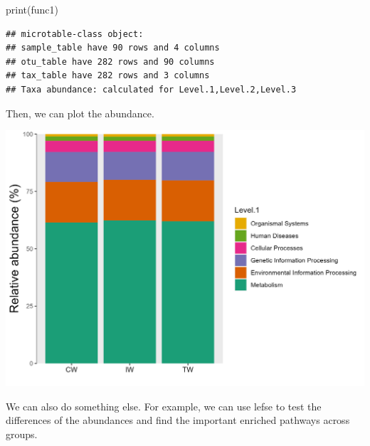 \documentclass[
]{book}
\newenvironment{Shaded}{\begin{snugshade}}{\end{snugshade}}
\newcommand{\AttributeTok}[1]{\textcolor[rgb]{0.77,0.63,0.00}{#1}}
\newcommand{\CommentTok}[1]{\textcolor[rgb]{0.56,0.35,0.01}{\textit{#1}}}
\newcommand{\ConstantTok}[1]{\textcolor[rgb]{0.00,0.00,0.00}{#1}}
\newcommand{\FunctionTok}[1]{\textcolor[rgb]{0.00,0.00,0.00}{#1}}
\newcommand{\NormalTok}[1]{#1}
\newcommand{\OtherTok}[1]{\textcolor[rgb]{0.56,0.35,0.01}{#1}}
\newcommand{\SpecialCharTok}[1]{\textcolor[rgb]{0.00,0.00,0.00}{#1}}
\newcommand{\StringTok}[1]{\textcolor[rgb]{0.31,0.60,0.02}{#1}}
\begin{document}
\begin{Shaded}
\begin{Highlighting}[]
\FunctionTok{print}\NormalTok{(func1)}
\end{Highlighting}
\end{Shaded}

\begin{verbatim}
## microtable-class object:
## sample_table have 90 rows and 4 columns
## otu_table have 282 rows and 90 columns
## tax_table have 282 rows and 3 columns
## Taxa abundance: calculated for Level.1,Level.2,Level.3
\end{verbatim}

Then, we can plot the abundance.

\begin{Shaded}
\end{Shaded}

\begin{center}\includegraphics[width=600px]{Images/plot_bar_tax4fun1} \end{center}

We can also do something else. For example, we can use lefse to test the differences of the abundances and find the important enriched pathways across groups.
\end{document}
